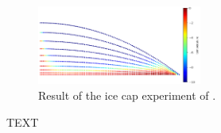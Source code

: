 \documentclass[gmd]{copernicus}
\begin{document}
\begin{figure}[!h]
\begin{center} 
\includegraphics[width=0.48\textwidth]{fig/hewitt2017.png}   
\end{center}
\caption{ Result of the ice cap experiment  of \citep{hewitt2017models}. \label{hewitt2017}}
\end{figure}










\conclusions  %
TEXT




\end{document}
